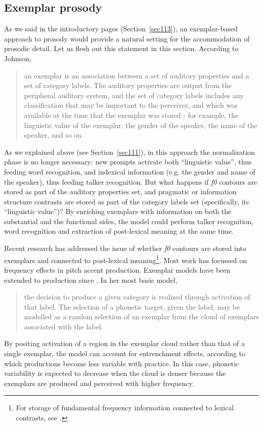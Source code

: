 \subsection{Exemplar prosody}\label{sec631}
As we said in the introductory pages (Section~\ref{sec113}), an exemplar-based approach to prosody would provide a natural setting for the accommodation of prosodic detail. Let us flesh out this statement in this section. According to Johnson, \begin{quote}an exemplar is an association between a set of auditory properties and a set of category labels. The auditory properties are output from the peripheral auditory system, and the set of category labels includes any classification that may be important to the perceiver, and which was available at the time that the exemplar was stored - for example, the linguistic value of the exemplar, the gender of the speaker, the name of the speaker, and so on. \cite[147]{johnson1997speech}\end{quote}
As we explained above (see Section~\ref{sec111}), in this approach the normalization phase is no longer necessary: new prompts activate both ``linguistic value'', thus feeding word recognition, and indexical information (e.g. the gender and name of the speaker), thus feeding talker recognition. But what happens if \textit{f0} contours are stored as part of the auditory properties set, and pragmatic or information structure contrasts are stored as part of the category labels set (specifically, its ``linguistic value'')? By enriching exemplars with information on both the substantial and the functional sides, the model could perform talker recognition, word recognition and extraction of post-lexical meaning at the same time.

Recent research has addressed the issue of whether \textit{f0} contours are stored into exemplars and connected to post-lexical meaning\footnote{For storage of fundamental frequency information connected to lexical contrasts, see \citet{sekiguchi2006effects}.}. Most work has focussed on frequency effects in pitch accent production. Exemplar models have been extended to production since \citet{pierrehumbert2001exemplar}. In her most basic model, \begin{quote}the decision to produce a given category is realized through activation of that label. The selection of a phonetic target, given the label, may be modelled as a random selection of an exemplar from the cloud of exemplars associated with the label.\end{quote}
By positing activation of a region in the exemplar cloud rather than that of a single exemplar, the model can account for entrenchment effects, according to which productions become less variable with practice. In this case, phonetic variability is expected to decrease when the cloud is denser because the exemplars are produced and perceived with higher frequency.

